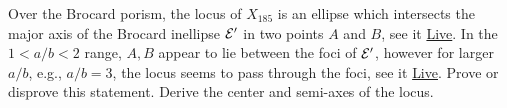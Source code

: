 \begin{exercise}
Over the Brocard porism, the locus of $X_{185}$ is an ellipse which intersects the major axis of the Brocard inellipse $\mathcal{E}'$ in two points $A$ and $B$, see it \href{https://bit.ly/2Rn0chC}{Live}. In the $1<a/b<2$ range, $A,B$ appear to lie between the foci of $\mathcal{E}'$, however for larger $a/b$, e.g., $a/b=3$, the locus seems to pass through the foci, see it \href{https://bit.ly/3icu7Eh}{Live}. Prove or disprove this statement. Derive the center and semi-axes of the locus. 
\end{exercise}